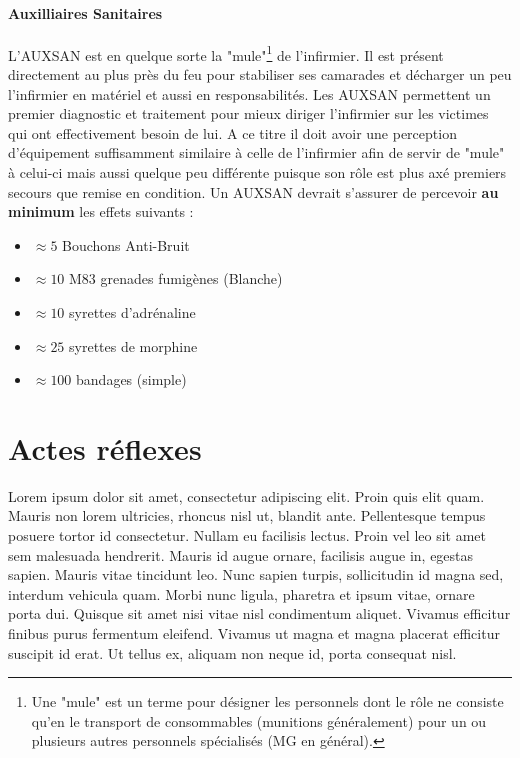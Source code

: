 \documentclass{article}
\begin{document}
			\subsection{Auxilliaires Sanitaires}
				L'AUXSAN est en quelque sorte la "mule"\footnote{Une "mule" est un terme pour désigner les personnels dont le rôle ne consiste qu'en le transport de consommables (munitions généralement) pour un ou plusieurs autres personnels spécialisés (MG en général).} de l'infirmier. Il est présent directement au plus près du feu pour stabiliser ses camarades et décharger un peu l'infirmier en matériel et aussi en responsabilités. Les AUXSAN permettent un premier diagnostic et traitement pour mieux diriger l'infirmier sur les victimes qui ont effectivement besoin de lui. A ce titre il doit avoir une perception d'équipement suffisamment similaire à celle de l'infirmier afin de servir de "mule" à celui-ci mais aussi quelque peu différente puisque son rôle est plus axé premiers secours que remise en condition. Un AUXSAN devrait s'assurer de percevoir \textbf{au minimum} les effets suivants :
				\begin{itemize}
				    \item $\approx5$ Bouchons Anti-Bruit
				    \item $\approx10$ M83 grenades fumigènes (Blanche)
				    \item $\approx10$ syrettes d'adrénaline
				    \item $\approx25$ syrettes de morphine
				    \item $\approx100$ bandages (simple)
				\end{itemize}
	
	\part{Actes réflexes}
		Lorem ipsum dolor sit amet, consectetur adipiscing elit. Proin quis elit quam. Mauris non lorem ultricies, rhoncus nisl ut, blandit ante. Pellentesque tempus posuere tortor id consectetur. Nullam eu facilisis lectus. Proin vel leo sit amet sem malesuada hendrerit. Mauris id augue ornare, facilisis augue in, egestas sapien. Mauris vitae tincidunt leo. Nunc sapien turpis, sollicitudin id magna sed, interdum vehicula quam. Morbi nunc ligula, pharetra et ipsum vitae, ornare porta dui. Quisque sit amet nisi vitae nisl condimentum aliquet. Vivamus efficitur finibus purus fermentum eleifend. Vivamus ut magna et magna placerat efficitur suscipit id erat. Ut tellus ex, aliquam non neque id, porta consequat nisl.
		
\end{document}
